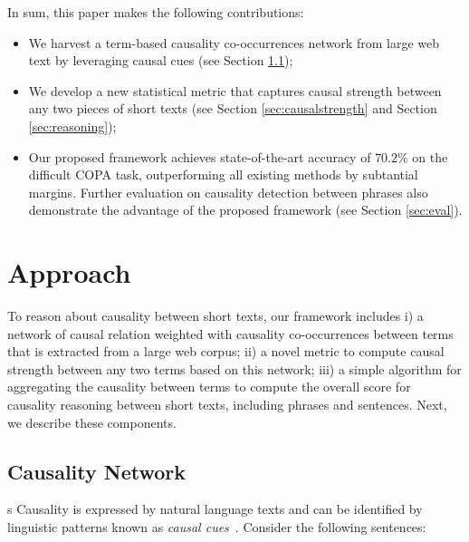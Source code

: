 \documentclass[letterpaper]{article}
\newcommand{\secref}[1]{Section \ref{#1}}
\begin{document}
In sum, this paper makes the following contributions:
\begin{itemize}
\item We harvest a term-based causality co-occurrences network from large
web text by leveraging causal cues (see \secref{sec:network});
\item We develop a new statistical metric that captures causal strength
between any two pieces of short texts (see \secref{sec:causalstrength}
and \secref{sec:reasoning});

\item Our proposed framework achieves state-of-the-art accuracy of $70.2\%$
on the difficult COPA task, outperforming all existing methods by subtantial margins.
Further evaluation on causality detection between phrases also
demonstrate the advantage of the proposed framework (see \secref{sec:eval}).
\end{itemize}

% 
\section{Approach}
\label{sec:approach}

To reason about causality between short texts,
our framework includes i) a network of causal relation weighted with
causality co-occurrences between terms that is extracted from
a large web corpus; ii) a novel metric to compute causal strength
 between any two terms based on this network; iii)
a simple algorithm for aggregating the causality between terms to
compute the overall score for causality reasoning between short texts,
including phrases and sentences.
Next, we describe these components.

\subsection{Causality Network}
\label{sec:network}
s
Causality is expressed by natural language texts and can be identified by
linguistic patterns known as {\em causal cues}~\cite{ChangC04}.
Consider the following sentences:

\end{document}
